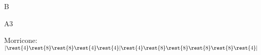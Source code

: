 \documentclass[timestamp]{jazzgrid}
\begin{document}
\begin{musicsection}{B}
\barline
	{\barfour{}
		{}
		{}
		{}
		{}
	}
	{\barfour{}
		{}
		{}
		{}
		{}
	}
	{\barfour{}
		{}
		{}
		{}
		{}
	}
	{\barfour{}
		{}
		{}
		{}
		{}
	}
\barline
	{\barfour{}
		{}
		{}
		{}
		{}
	}
	{\barfour{}
		{}
		{}
		{}
		{}
	}
	{\barfour{}
		{}
		{}
		{}
		{}
	}
	{\barfour{}
		{}
		{}
		{}
		{}
	}
\end{musicsection}

\begin{musicsection}{A3}
\barline
	{\barfour{}
		{}
		{}
		{}
		{}
	}
	{\barfour{}
		{}
		{}
		{}
		{}
	}
	{\barfour{}
		{}
		{}
		{}
		{}
	}
	{\barfour{}
		{}
		{}
		{}
		{}
	}
\barline
	{\barfour{}
		{}
		{}
		{}
		{}
	}
	{\barfour{}
		{}
		{}
		{}
		{}
	}
	{
		{}
		{}
		{}
		{}
	}
	{\barfour{}
		{}
		{}
		{}
		{}
	}
\end{musicsection}

\raggedright
\tiny{Morricone: }\normalsize  $|\rest{4}\rest{8}\rest{8}\rest{4}\rest{4}|\rest{4}\rest{8}\rest{8}\rest{8}\rest{8}\rest{4}|$
\end{document}
